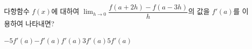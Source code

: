 다항함수 $f(x)$에 대하여 $\displaystyle\lim_{h\to 0}\dfrac{f(a+2h)-f(a-3h)}{h}$의 값을 $f'(a)$를 이용하여 나타내면?
\begin{choices32}{$-5f'(a)$}{$-f'(a)$}{$f'(a)$}{$3f'(a)$}{$5f'(a)$}\end{choices32}
